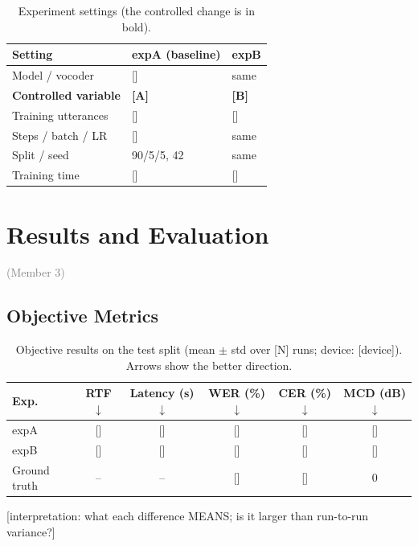 \documentclass[11pt,a4paper]{article}
\newcommand{\ph}[1]{\colorbox{red!12}{\textcolor{red!70!black}{\small\textsf{[#1]}}}}
\newcommand{\owner}[1]{\hfill{\small\textcolor{gray}{(#1)}}}
\begin{document}
\begin{table}[h]
\centering
\caption{Experiment settings (the controlled change is in bold).}
\label{tab:settings}
\begin{tabular}{@{}lll@{}}
\toprule
Setting & expA (baseline) & expB \\ \midrule
Model / vocoder & \ph{} & same \\
\textbf{Controlled variable} & \textbf{\ph{A}} & \textbf{\ph{B}} \\
Training utterances & \ph{} & \ph{} \\
Steps / batch / LR & \ph{} & same \\
Split / seed & 90/5/5, 42 & same \\
Training time & \ph{} & \ph{} \\ \bottomrule
\end{tabular}
\end{table}

\section{Results and Evaluation}\label{sec:results}\owner{Member 3}
\subsection{Objective Metrics}
\begin{table}[h]
\centering
\caption{Objective results on the test split (mean $\pm$ std over \ph{N} runs; device: \ph{device}). Arrows show the better direction.}
\label{tab:results}
\begin{tabular}{@{}lccccc@{}}
\toprule
Exp. & RTF $\downarrow$ & Latency (s) $\downarrow$ & WER (\%) $\downarrow$ & CER (\%) $\downarrow$ & MCD (dB) $\downarrow$ \\ \midrule
expA & \ph{} & \ph{} & \ph{} & \ph{} & \ph{} \\
expB & \ph{} & \ph{} & \ph{} & \ph{} & \ph{} \\
Ground truth & -- & -- & \ph{} & \ph{} & 0 \\ \bottomrule
\end{tabular}
\end{table}
\noindent\ph{interpretation: what each difference MEANS; is it larger than run-to-run variance?}
\end{document}
